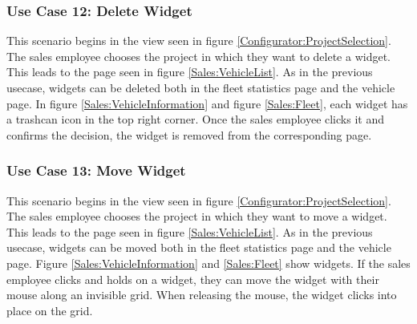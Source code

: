 \subsubsection{Use Case 12: Delete Widget}

This scenario begins in the view seen in figure \ref{Configurator:ProjectSelection}. The sales employee chooses the project in which they want to delete a widget. This leads to the page seen in figure \ref{Sales:VehicleList}. As in the previous \gls{usecase}, \glspl{widget} can be deleted both in the fleet statistics page and the vehicle page. In figure \ref{Sales:VehicleInformation} and figure \ref{Sales:Fleet}, each \gls{widget} has a trashcan icon in the top right corner. Once the sales employee clicks it and confirms the decision, the \gls{widget} is removed from the corresponding page.


\subsubsection{Use Case 13: Move Widget}

This scenario begins in the view seen in figure \ref{Configurator:ProjectSelection}. The sales employee chooses the project in which they want to move a widget. This leads to the page seen in figure \ref{Sales:VehicleList}. As in the previous \gls{usecase}, \glspl{widget} can be moved both in the fleet statistics page and the vehicle page. Figure \ref{Sales:VehicleInformation} and \ref{Sales:Fleet} show \glspl{widget}. If the sales employee clicks and holds on a widget, they can move the \gls{widget} with their mouse along an invisible grid. When releasing the mouse, the \gls{widget} clicks into place on the grid.